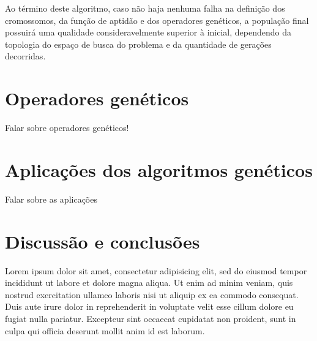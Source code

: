 \documentclass[12pt]{article}
\begin{document}
Ao término deste algoritmo, caso não haja nenhuma falha na definição dos cromossomos, da função de aptidão e dos operadores genéticos, a população final possuirá uma qualidade consideravelmente superior à inicial, dependendo da topologia do espaço de busca do problema e da quantidade de gerações decorridas.

\section{Operadores genéticos} \label{sec:geneticoperators}

Falar sobre operadores genéticos!

\section{Aplicações dos algoritmos genéticos} \label{sec:applications}

Falar sobre as aplicações

\section{Discussão e conclusões} \label{sec:conclusions}

Lorem ipsum dolor sit amet, consectetur adipisicing elit, sed do eiusmod tempor incididunt ut labore et dolore magna aliqua. Ut enim ad minim veniam, quis nostrud exercitation ullamco laboris nisi ut aliquip ex ea commodo consequat. Duis aute irure dolor in reprehenderit in voluptate velit esse cillum dolore eu fugiat nulla pariatur. Excepteur sint occaecat cupidatat non proident, sunt in culpa qui officia deserunt mollit anim id est laborum.



\end{document}
